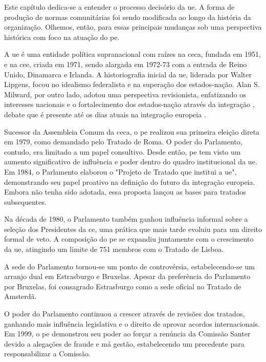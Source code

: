 Este capítulo dedica-se a entender o processo decisório da \acrshort{ue}. A forma de produção de normas comunitárias foi  sendo modificada ao longo da história da organização. Olhemos, então, para essas principais mudanças sob uma perspectiva histórica com foco na atuação do \acrshort{pe}.

A \acrshort{ue} é uma entidade política supranacional com raízes na \acrfull{ceca}, fundada em 1951, e na \acrfull{cee}, criada em 1971, sendo alargada em 1972-73 com a entrada de Reino Unido, Dinamarca e Irlanda. A historiografia inicial da \acrshort{ue}, liderada por Walter Lipgens, focou no idealismo federalista e na superação dos estados-nação. Alan S. Milward, por outro lado, adotou uma perspectiva revisionista, enfatizando os interesses nacionais e o fortalecimento dos estados-nação através da integração \cite{kaiser_history_2009}, debate que é presente até os dias atuais na integração europeia \cite{engelbrekt_eu_2023}. 

Sucessor da Assembleia Comum da \acrshort{ceca}, o \acrshort{pe} realizou sua primeira eleição direta em 1979, como demandado pelo Tratado de Roma. O poder do Parlamento, contudo, era limitado a um papel consultivo. Desde então, \acrshort{pe} tem visto um aumento significativo de influência e poder dentro do quadro institucional da \acrshort{ue}. Em 1984, o Parlamento elaborou o "Projeto de Tratado que institui a \acrshort{ue}", demonstrando seu papel proativo na definição do futuro da integração europeia. Embora não tenha sido adotada, essa proposta lançou as bases para tratados subsequentes.

Na década de 1980, o Parlamento também ganhou influência informal sobre a seleção dos Presidentes da \acrshort{ce}, uma prática que mais tarde evoluiu para um direito formal de veto. A composição do \acrshort{pe} se expandiu juntamente com o crescimento da \acrshort{ue}, atingindo um limite de 751 membros com o Tratado de Lisboa.

A sede do Parlamento tornou-se um ponto de controvérsia, estabelecendo-se um arranjo dual em Estrasburgo e Bruxelas. Apesar da preferência do Parlamento por Bruxelas, foi consagrado Estrasburgo como a sede oficial no Tratado de Amsterdã.

O poder do Parlamento continuou a crescer através de revisões dos tratados, ganhando mais influência legislativa e o direito de aprovar acordos internacionais. Em 1999, o \acrshort{pe} demonstrou seu poder ao forçar a renúncia da Comissão Santer devido a alegações de fraude e má gestão, estabelecendo um precedente para responsabilizar a Comissão.

